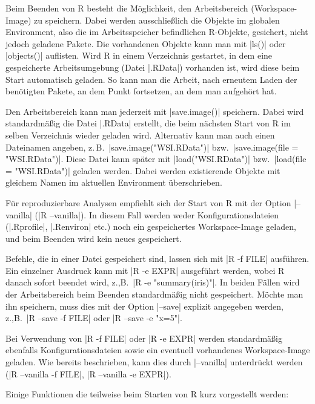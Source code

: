 \documentclass[10pt,twocolumn]{scrartcl}
\renewcommand{\lstinline}{\mycoloredinline}
\begin{document}
Beim Beenden von R besteht die Möglichkeit, den Arbeitsbereich (Workspace-Image) zu speichern. Dabei werden ausschließlich die Objekte im globalen Environment, also die im Arbeitsspeicher befindlichen R-Objekte, gesichert, nicht jedoch geladene Pakete. Die vorhandenen Objekte kann man mit \lstinline|ls()| oder \lstinline|objects()| auflisten. Wird R in einem Verzeichnis gestartet, in dem eine gespeicherte Arbeitsumgebung (Datei \lstinline|.RData|) vorhanden ist, wird diese beim Start automatisch geladen. So kann man die Arbeit, nach erneutem Laden der benötigten Pakete, an dem Punkt fortsetzen, an dem man aufgehört hat.

Den Arbeitsbereich kann man jederzeit mit \lstinline|save.image()| speichern. Dabei wird standardmäßig die Datei \lstinline|.RData| erstellt, die beim nächsten Start von R im selben Verzeichnis wieder geladen wird. Alternativ kann man auch einen Dateinamen angeben, z.\,B.\ \lstinline|save.image("WSI.RData")| bzw.\ \lstinline|save.image(file = "WSI.RData")|. Diese Datei kann später mit \lstinline|load("WSI.RData")| bzw.\ \lstinline|load(file = "WSI.RData")| geladen werden. Dabei werden existierende Objekte mit gleichem Namen im aktuellen Environment überschrieben.

Für reproduzierbare Analysen empfiehlt sich der Start von R mit der Option \lstinline|--vanilla| (\lstinline|R --vanilla|). In diesem Fall werden weder Konfigurationsdateien (\lstinline|.Rprofile|, \lstinline|.Renviron| etc.) noch ein gespeichertes Workspace-Image geladen, und beim Beenden wird kein neues gespeichert.

Befehle, die in einer Datei gespeichert sind, lassen sich mit \lstinline|R -f FILE| ausführen. Ein einzelner Ausdruck kann mit \lstinline|R -e EXPR| ausgeführt werden, wobei R danach sofort beendet wird, z.,B.\ \lstinline|R -e "summary(iris)"|. In beiden Fällen wird der Arbeitsbereich beim Beenden standardmäßig nicht gespeichert. Möchte man ihn speichern, muss dies mit der Option \lstinline|--save| explizit angegeben werden, z.,B.\ \lstinline|R --save -f FILE| oder \lstinline|R --save -e "x=5"|.

Bei Verwendung von \lstinline|R -f FILE| oder \lstinline|R -e EXPR| werden standardmäßig ebenfalls Konfigurationsdateien sowie ein eventuell vorhandenes Workspace-Image geladen. Wie bereits beschrieben, kann dies durch \lstinline|--vanilla| unterdrückt werden (\lstinline|R --vanilla -f FILE|, \lstinline|R --vanilla -e EXPR|).

Einige Funktionen die teilweise beim Starten von R kurz vorgestellt werden:
\end{document}
